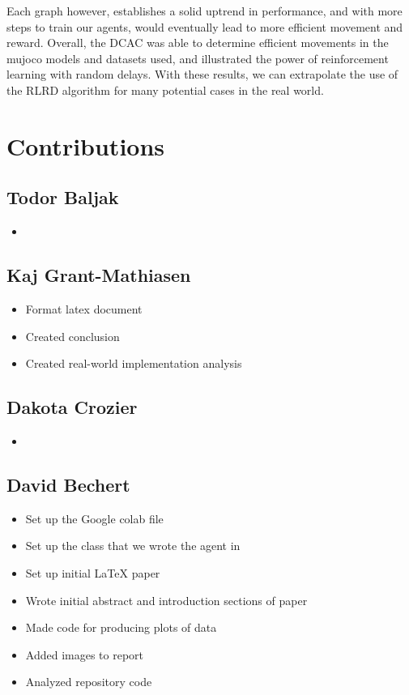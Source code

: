 \documentclass{article} %
\begin{document}
Each graph however, establishes a solid uptrend in performance, and with more steps to train our agents, would eventually lead to more efficient movement and reward. Overall, the DCAC was able to determine efficient movements in the mujoco models and datasets used, and illustrated the power of reinforcement learning with random delays. With these results, we can extrapolate the use of the RLRD algorithm for many potential cases in the real world.

\section{Contributions}

\begin{multicols}{2}

\subsection{Todor Baljak}
\begin{itemize}[itemsep=-2pt,topsep=-5pt, leftmargin=10pt]
\item 
\end{itemize}

\subsection{Kaj Grant-Mathiasen}
\begin{itemize}[itemsep=-2pt,topsep=-5pt, leftmargin=10pt]
\item Format latex document
\item Created conclusion
\item Created real-world implementation analysis
\end{itemize}

\subsection{Dakota Crozier}
\begin{itemize}[itemsep=-2pt,topsep=-5pt, leftmargin=10pt]
\item 
\end{itemize}

\columnbreak

\subsection{David Bechert}
\begin{itemize}[itemsep=-2pt,topsep=-5pt, leftmargin=10pt]
\item Set up the Google colab file
\item Set up the class that we wrote the agent in
\item Set up initial LaTeX paper
\item Wrote initial abstract and introduction sections of paper
\item Made code for producing plots of data
\item Added images to report
\item Analyzed repository code
\end{itemize}


\end{multicols}
\end{document}
